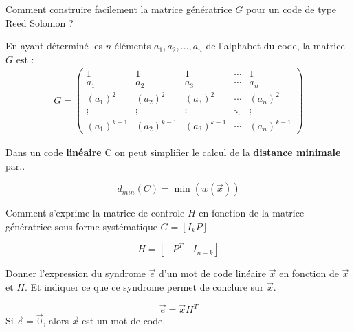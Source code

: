 \documentclass[12pt]{article}
\newcommand*{\xfield}[1]{\begin{mdframed}\centering #1\end{mdframed}\bigskip}
\newenvironment{note}{}{}
\begin{document}
\begin{note}
	\xfield{Comment construire facilement la matrice génératrice $G$ pour un code de type Reed Solomon ?}
	\xfield{En ayant déterminé les $n$ éléments $a_1,a_2,\hdots,a_n$ de l'alphabet du code, la matrice $G$ est :
	\begin{align*}
	G = \begin{pmatrix}
	1 & 1 & 1 & \cdots & 1\\
	a_1 & a_2 & a_3 & \cdots & a_n\\
	(a_1)^2 & (a_2)^2 & (a_3)^2 & \cdots & (a_n)^2\\
	\vdots & \vdots & \vdots & \ddots & \vdots\\
	(a_1)^{k-1} & (a_2)^{k-1} & (a_3)^{k-1} & \cdots & (a_n)^{k-1}
	\end{pmatrix}
	\end{align*} }
\end{note}

\begin{note}
\xfield{Dans un code \textbf{linéaire} C on peut simplifier le calcul de la \textbf{distance minimale} par..}
\xfield{$$d_{min}(C) = \min(w(\vec{x}))$$}
\end{note}

\begin{note}
\xfield{Comment s'exprime la matrice de controle $H$ en fonction de la matrice génératrice sous forme systématique $G = [I_k P]$}
\xfield{$$H = [-P^T \hspace{1em} I_{n-k}]$$}
\end{note}

\begin{note}
\xfield{Donner l'expression du syndrome $\vec{e}$ d'un mot de code linéaire $\vec{x}$ en fonction de $\vec{x}$ et $H$. Et indiquer ce que ce syndrome permet de conclure sur $\vec{x}$.}
\xfield{
$$\vec{e} = \vec{x}H^T$$
Si $\vec{e} = \vec{0}$, alors $\vec{x}$ est un mot de code.
}
\end{note}
\end{document}
